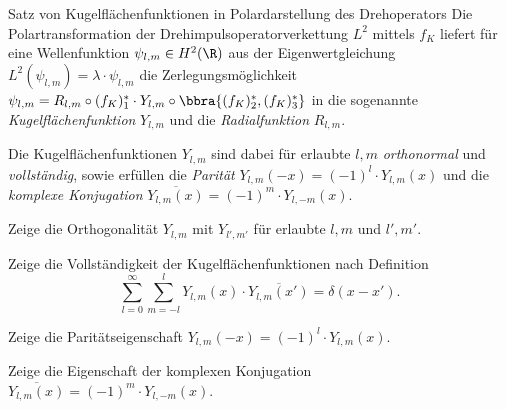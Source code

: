 \documentclass{subfiles}
\begin{document}
        \begin{mcor}{Satz von Kugelflächenfunktionen in Polardarstellung des Drehoperators}
            Die Polartransformation der Drehimpulsoperatorverkettung $L^2$ mittels $f_K$ liefert für eine Wellenfunktion $\psi_{l,m}\in H^2(\R)$ aus der Eigenwertgleichung $L^2(\psi_{l,m}) = \lambda\cdot\psi_{l,m}$ die Zerlegungsmöglichkeit $\psi_{l,m} = R_{l,m}\circ (f_K)_1^* \cdot Y_{l,m}\circ\bbra{(f_K)_2^*,(f_K)_3^*}$ in die sogenannte \emph{Kugelflächenfunktion} $Y_{l,m}$ und die \emph{Radialfunktion} $R_{l,m}$. 

            Die Kugelflächenfunktionen $Y_{l,m}$ sind dabei für erlaubte $l,m$ \emph{orthonormal} und \emph{vollständig}, sowie erfüllen die \emph{Parität} $Y_{l,m}(-x) = (-1)^l\cdot Y_{l,m}(x)$ und die \emph{komplexe Konjugation} $\overline{Y_{l,m}(x)} = (-1)^m\cdot Y_{l,-m}(x)$.
        \end{mcor}
        \begin{Aufgabe}
            \nr{} Zeige die Orthogonalität $Y_{l,m}$ mit $Y_{l',m'}$ für erlaubte $l,m$ und $l',m'$.

            \nr{} Zeige die Vollständigkeit der Kugelflächenfunktionen nach Definition 
            \[
                \sum_{l=0}^\infty\sum_{m=-l}^l Y_{l,m}(x)\cdot\overline{Y_{l,m}(x')} = \delta(x-x').
            \]

            \nr{} Zeige die Paritätseigenschaft $Y_{l,m}(-x) = (-1)^l\cdot Y_{l,m}(x)$.

            \nr{} Zeige die Eigenschaft der komplexen Konjugation $\overline{Y_{l,m}(x)} = (-1)^m\cdot Y_{l,-m}(x)$.
        \end{Aufgabe}

    

    
\end{document}
